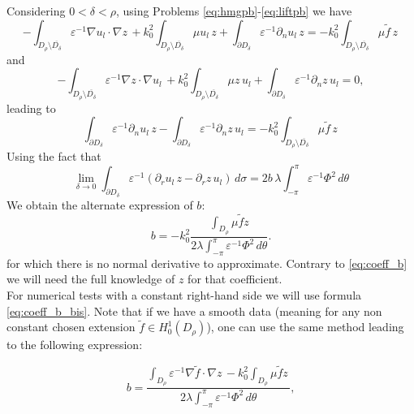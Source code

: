 \documentclass[11pt]{article}
\newcommand{\grad}{\nabla}
\theoremstyle{plain}
\begin{document}
Considering $ 0 < \delta < \rho$,  using Problems \eqref{eq:hmgpb}-\eqref{eq:liftpb} we have 
\[\displaystyle - \int_{D_{\rho} \setminus \overline{D_\delta}} \varepsilon^{-1} \nabla u_l \cdot {\nabla z} \, + k_0^2 \int_{D_{\rho}\setminus \overline{D_\delta}} \mu  u_l  \,{z} + \int_{\partial D_\delta}  \varepsilon^{-1} \partial_n u_l \, z = - k^2_0\displaystyle  \int_{D_{\rho}\setminus \overline{D_\delta}} \mu \tilde{f}  \, z \,
\]
and
\[\displaystyle - \int_{D_{\rho} \setminus \overline{D_\delta}} \varepsilon^{-1} \nabla z \cdot {\nabla u_l} \, + k_0^2 \int_{D_{\rho}\setminus \overline{D_\delta}} \mu  z  \,{u_l} + \int_{\partial D_\delta}  \varepsilon^{-1} \partial_n z \, u_l =0,
\]
leading to
\begin{equation}
\int_{\partial D_\delta}  \varepsilon^{-1} \partial_n u_l \, z -  \int_{\partial D_\delta}  \varepsilon^{-1} \partial_n z \, u_l = - k^2_0\displaystyle  \int_{D_{\rho}\setminus \overline{D_\delta}} \mu \tilde{f}  \, z \,
\end{equation}
Using the fact that
\begin{equation}\label{calculusCoef2}
\lim \limits_{\delta \to 0} \displaystyle   \int_{ \partial D_\delta} \varepsilon^{-1} \left( \partial_r u_l \,z- \partial_r z\,u_l \right)\, d\sigma =2  b  \, \lambda \displaystyle \int_{-\pi}^{\pi} \varepsilon^{-1} \Phi^2\, d\theta 
\end{equation}
We obtain the alternate expression of $b$:
\begin{equation}\label{eq:coeff_b_bis}
b =- k_0^2\displaystyle   \frac{\displaystyle  \int_{D_\rho} \mu \tilde{f} {z}}{2  \lambda \displaystyle \int_{-\pi}^{\pi} \varepsilon^{-1} \Phi^2\, d\theta}.
\end{equation}
for which there is no normal derivative to approximate. Contrary to \eqref{eq:coeff_b} we will need the full knowledge of $z$ for that coefficient. \\

For numerical tests with a constant right-hand side we will use formula \eqref{eq:coeff_b_bis}. Note that if we have a smooth data (meaning for any non constant chosen extension $\tilde{f} \in H^1_0(D_\rho)$), one can use the same method leading to the following expression:

\begin{equation}\label{eq:coeff_b_ter}
b =\displaystyle   \frac{\displaystyle  \int_{D_\rho} \varepsilon^{-1}  \grad \tilde{f} \cdot \grad {z}\, - k_0^2\displaystyle  \int_{D_\rho} \mu \tilde{f} {z}\,}{2  \lambda \displaystyle \int_{-\pi}^{\pi} \varepsilon^{-1} \Phi^2\, d\theta},
\end{equation}
\end{document}
